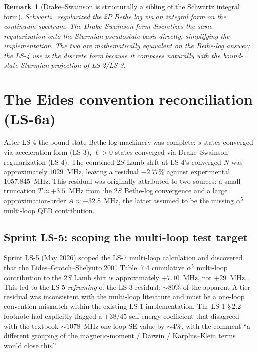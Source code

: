 \documentclass[11pt]{article}
\newtheorem{remark}{Remark}
\begin{document}
\begin{remark}[Drake--Swainson is structurally a sibling of the Schwartz integral form]
\label{rem:drake_schwartz}
Schwartz~\cite{schwartz1961} regularized the 2$P$ Bethe log via an
integral form on the continuum spectrum.  The Drake--Swainson form
discretizes the same regularization onto the Sturmian pseudostate
basis directly, simplifying the implementation.  The two are
mathematically equivalent on the Bethe-log answer; the LS-4 use is
the discrete form because it composes naturally with the bound-state
Sturmian projection of LS-2/LS-3.
\end{remark}

\section{The Eides convention reconciliation (LS-6a)}
\label{sec:eides}

After LS-4 the bound-state Bethe-log machinery was complete:
$s$-states converged via acceleration form (LS-3), $\ell > 0$ states
converged via Drake--Swainson regularization (LS-4).  The combined
2$S$ Lamb shift at LS-4's converged $N$ was approximately
$1029$~MHz, leaving a residual $-2.77\%$ against experimental
$1057.845$~MHz.  This residual was originally attributed to two
sources: a small truncation $T \approx +3.5$~MHz from the 2$S$
Bethe-log convergence and a large approximation-order
$A \approx -32.8$~MHz, the latter assumed to be the missing $\alpha^5$
multi-loop QED contribution.

\subsection{Sprint LS-5: scoping the multi-loop test target}

Sprint LS-5 (May 2026) scoped the LS-7 multi-loop calculation and
discovered that the Eides--Grotch--Shelyuto 2001 Table~7.4
cumulative $\alpha^5$ multi-loop contribution to the 2$S$ Lamb shift
is approximately $+7.10$~MHz, not $+29$~MHz.  This led to the LS-5
\emph{reframing} of the LS-3 residual: $\sim 80\%$ of the apparent
A-tier residual was inconsistent with the multi-loop literature and
must be a one-loop convention mismatch within the existing LS-1
implementation.  The LS-1 \S\,2.2 footnote had explicitly flagged a
$+38/45$ self-energy coefficient that disagreed with the textbook
$\sim 1078$~MHz one-loop SE value by $\sim 4\%$, with the comment
``a different grouping of the magnetic-moment / Darwin /
Karplus--Klein terms would close this.''
\end{document}

